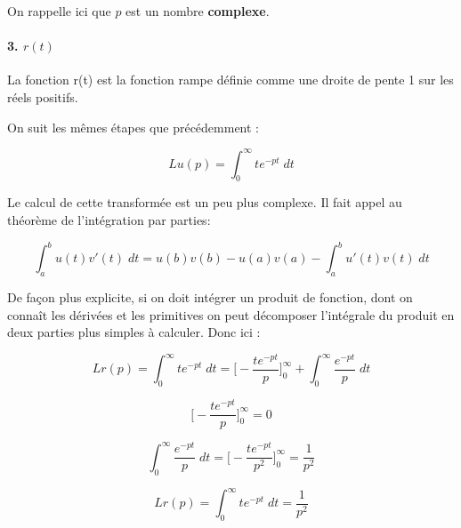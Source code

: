 \documentclass[11pt,a4paper]{article}
\begin{document}
On rappelle ici que $p$ est un nombre \textbf{complexe}.

\paragraph{\textbf{3.} $r(t)$}
La fonction r(t) est la fonction rampe définie comme une droite de pente 1 sur les réels positifs.

\begin{center}
\end{center}


On suit les mêmes étapes que précédemment : 

\[L{u}(p) = \int^{\infty}_{0} t e^{-pt} \; dt\]

Le calcul de cette transformée est un peu plus complexe. Il fait appel au théorème de l'intégration par parties:

\[\int^{b}_{a} u(t) v'(t) \; dt =  u(b) v(b)-u(a) v(a) -\int^{b}_{a} u'(t) v(t) \; dt  \] 

De façon plus explicite, si on doit intégrer un produit de fonction, dont on connaît les dérivées et les primitives on peut décomposer l'intégrale du produit en deux parties plus simples à calculer. Donc ici :

\[L{r}(p) = \int^{\infty}_{0} t e^{-pt} \; dt =  \Big[-\frac{te^{-pt}}{p}\Big]^{\infty}_{0} + \int^{\infty}_{0} \frac{e^{-pt}}{p} \; dt\]

\[ \Big[-\frac{te^{-pt}}{p}\Big]^{\infty}_{0} = 0\]

\[ \int^{\infty}_{0} \frac{e^{-pt}}{p} \; dt = \Big[-\frac{te^{-pt}}{p^2}\Big]^{\infty}_{0} = \frac{1}{p^2}\]

\[ L{r}(p) = \int^{\infty}_{0} t e^{-pt} \; dt  = \frac{1}{p^2}\]
\end{document}
